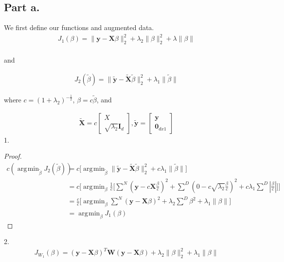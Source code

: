 \documentclass[12pt]{article}
\DeclareMathOperator*{\argmin}{arg\!\min}
\begin{document}
\subsection*{Part a.}
We first define our functions and augmented data.
\begin{align*}
J_1(\beta) = \|\textbf{y} - \textbf{X}\beta\|^2_2 + \lambda_2\|\beta\|^2_2 + \lambda\|\beta\| \\
\end{align*}
\begin{center}
and
\end{center}
\begin{align*}
J_2(\widetilde{\beta}) = \|\widetilde{\textbf{y}} - \widetilde{\textbf{X}}\widetilde{\beta}\|^2_2 + \lambda_1\|\widetilde{\beta}\|
\end{align*}
\begin{center}
where $c = (1 + \lambda_2)^{-\frac{1}{2}}$, $\beta = c\widetilde{\beta}$, and
\end{center}
\begin{align*}
\widetilde{\textbf{X}} = c 
\begin{bmatrix} 
X \\
\sqrt{\lambda_2}\textbf{I}_d
\end{bmatrix}
, \widetilde{\textbf{y}} = 
\begin{bmatrix}
\textbf{y} \\
\textbf{0}_{dx1}
\end{bmatrix}
\end{align*}
1.
\begin{proof}
\begin{align*}
c(\argmin_{\widetilde{\beta}} J_2(\widetilde{\beta})) &= c\lbrack \argmin_{\widetilde{\beta}} \|\widetilde{\textbf{y}} - \widetilde{\textbf{X}}\widetilde{\beta}\|^2_2 + c\lambda_1\|\widetilde{\beta}\| \rbrack \\
&= c\lbrack \argmin_{\beta} \frac{1}{c}\lbrack \sum^{N}(\textbf{y} - c\textbf{X}\frac{\beta}{c})^2 + \sum^{D}(0 - c\sqrt{\lambda_2}\frac{\beta}{c})^2 + c\lambda_1 \sum^{D} |\frac{\beta}{c}|\rbrack\rbrack \\
&= \frac{c}{c}\lbrack \argmin_{\beta} \sum^{N}(\textbf{y} - \textbf{X}\beta)^2 + \lambda_2 \sum^{D}\beta^2 + \lambda_1 \|\beta\|\rbrack \\
&= \argmin_\beta J_1(\beta)
\end{align*}
\end{proof}
2. 
\begin{align*}
J_{W_1}(\beta) = (\textbf{y} - \textbf{X}\beta)^T \textbf{W} (\textbf{y} - \textbf{X}\beta)+ \lambda_2\|\beta\|^2_2 + \lambda_1\|\beta\|
\end{align*}
\end{document}

